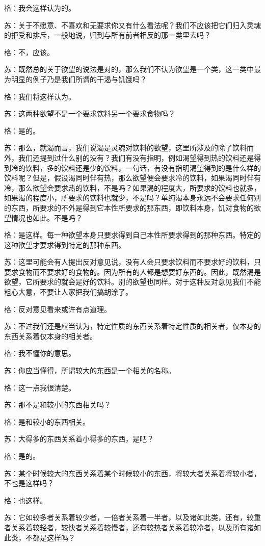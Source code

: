 \documentclass[12pt,oneside]{book}
\begin{document}
格：我会这样认为的。

苏：关于不愿意、不喜欢和无要求你又有什么看法呢？我们不应该把它们归入灵魂的拒受和排斥，一般地说，归到与所有前者相反的那一类里去吗？

格：不，应该。

苏：既然总的关于欲望的说法是对的，那么我们不认为欲望是一个类，这一类中最为明显的例子乃是我们所谓的干渴与饥饿吗？

格：我们将这样认为。

苏：这两种欲望不是一个要求饮料另一个要求食物吗？

格：是的。

苏：那么，就渴而言，我们说渴是灵魂对饮料的欲望，这里所涉及的除了饮料而外，我们还提到过什么别的没有？我们有没有指明，例如渴望得到热的饮料还是得到冷的饮料，多的饮料还是少的饮料，一句话，有没有指明渴望得到的是什么样的饮料呢？但是，假设渴同时伴有热，那么欲望便会要求冷的饮料，如果渴同时伴有冷，那么欲望会要求热的饮料，不是吗？如果渴的程度大，所要求的饮料也就多，如果渴的程度小，所要求的饮料也就少，不是吗？单纯渴本身永远不会要求任何别的东西，所要求的不外是得到它本性所要求的那东西，即饮料本身，饥对食物的欲望情况也如此。不是吗？

格：是这样。每一种欲望本身只要求得到自己本性所要求得到的那种东西。特定的这种欲望才要求得到特定的那种东西。

苏：这里可能会有人提出反对意见说，没有人会只要求饮料而不要求好的饮料，只要求食物而不要求好的食物的。因为所有的人都是想要好东西的。因此，既然渴是欲望，它所要求的就会是好的饮料。别的欲望也同样。对于这种反对意见我们不能粗心大意，不要让人家把我们搞胡涂了。

格：反对意见看来或许有点道理。

苏：不过我们还是应当认为，特定性质的东西关系着特定性质的相关者，仅本身的东西关系着仅本身的相关者。

格：我不懂你的意思。

苏：你应当懂得，所谓较大的东西是一个相关的名称。

格：这一点我很清楚。

苏：那不是和较小的东西相关吗？

格：是和较小的东西相关。

苏：大得多的东西关系着小得多的东西，是吧？

格：是的。

苏：某个时候较大的东西关系着某个时候较小的东西，将较大者关系着将较小者，不也是这样吗？

格：也这样。

苏：它如较多者关系着较少者，一倍者关系着一半者，以及诸如此类，还有，较重者关系着较轻者，较快者关系着较慢者，还有较热者关系着较冷者，以及所有诸如此类，不都是这样吗？
\end{document}
